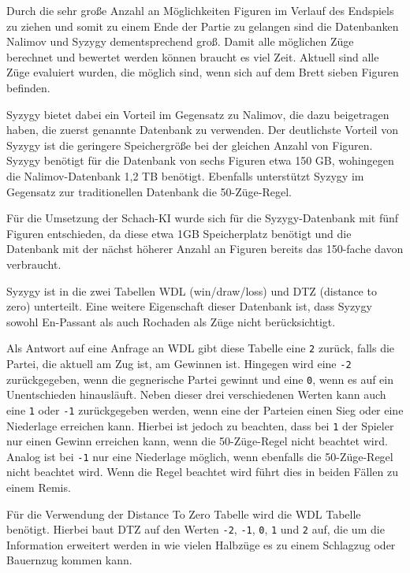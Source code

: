 Durch die sehr große Anzahl an Möglichkeiten Figuren im Verlauf des
Endspiels zu ziehen und somit zu einem Ende der Partie zu gelangen sind
die Datenbanken Nalimov und Syzygy dementsprechend groß. Damit alle
möglichen Züge berechnet und bewertet werden können braucht es viel
Zeit. Aktuell sind alle Züge evaluiert wurden, die möglich sind, wenn
sich auf dem Brett sieben Figuren befinden.

Syzygy bietet dabei ein Vorteil im Gegensatz zu Nalimov, die dazu
beigetragen haben, die zuerst genannte Datenbank zu verwenden. Der
deutlichste Vorteil von Syzygy ist die geringere Speichergröße bei der
gleichen Anzahl von Figuren. Syzygy benötigt für die Datenbank von sechs
Figuren etwa 150 GB, wohingegen die Nalimov-Datenbank 1,2 TB benötigt.
Ebenfalls unterstützt Syzygy im Gegensatz zur traditionellen Datenbank
die 50-Züge-Regel.

Für die Umsetzung der Schach-KI wurde sich für die Syzygy-Datenbank mit
fünf Figuren entschieden, da diese etwa 1GB Speicherplatz benötigt und
die Datenbank mit der nächst höherer Anzahl an Figuren bereits das
150-fache davon verbraucht.

Syzygy ist in die zwei Tabellen WDL (win/draw/loss) und DTZ (distance to
zero) unterteilt. Eine weitere Eigenschaft dieser Datenbank ist, dass
Syzygy sowohl En-Passant als auch Rochaden als Züge nicht
berücksichtigt.

Als Antwort auf eine Anfrage an WDL gibt diese Tabelle eine \texttt{2}
zurück, falls die Partei, die aktuell am Zug ist, am Gewinnen ist.
Hingegen wird eine \texttt{-2} zurückgegeben, wenn die gegnerische
Partei gewinnt und eine \texttt{0}, wenn es auf ein
Unentschieden hinausläuft. Neben dieser drei verschiedenen Werten kann
auch eine \texttt{1} oder \texttt{-1} zurückgegeben werden, wenn eine
der Parteien einen Sieg oder eine Niederlage erreichen kann. Hierbei ist jedoch zu beachten, dass bei \texttt{1} der Spieler nur einen Gewinn erreichen kann, wenn die 50-Züge-Regel nicht beachtet wird. Analog ist bei \texttt{-1} nur eine Niederlage möglich, wenn ebenfalls die 50-Züge-Regel nicht beachtet wird. Wenn die Regel beachtet wird führt dies in beiden Fällen zu einem Remis.

Für die Verwendung der Distance To Zero Tabelle wird die WDL Tabelle benötigt. Hierbei baut DTZ
auf den Werten \texttt{-2}, \texttt{-1}, \texttt{0}, \texttt{1} und
\texttt{2} auf, die um die Information erweitert werden in wie vielen
Halbzüge es zu einem Schlagzug oder Bauernzug kommen kann.

